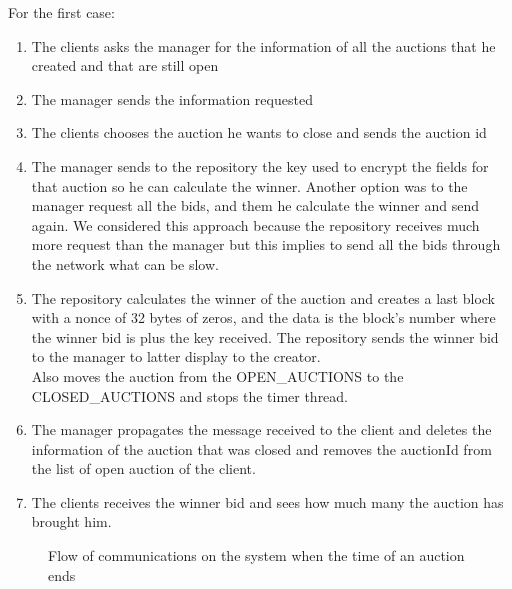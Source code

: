 \documentclass[12pt]{article}
\begin{document}
For the first case:

\begin{enumerate}
    \item The clients asks the manager for the information of all the auctions
      that he created and that are still open

    \item The manager sends the information requested

    \item The clients chooses the auction he wants to close and sends the auction id

    \item The manager sends to the repository the key used to encrypt the fields
      for that auction so he can calculate the winner. Another option was to the manager 
      request all the bids, and them he calculate the winner and send again. We considered
      this approach because the repository receives much more request than the manager but
      this implies to send all the bids through the network what can be slow.

    \item The repository calculates the winner of the auction and creates a last block with
      a nonce of 32 bytes of zeros, and the data is the block's number where the winner bid is plus the key received. 
      The repository sends the winner bid to the manager to latter display to 
      the creator. \\
      Also moves the auction from the OPEN\_AUCTIONS to the CLOSED\_AUCTIONS and stops the timer
        thread.

    \item The manager propagates the message received to the client and deletes the information
      of the auction that was closed and removes the auctionId from the list of open auction of the 
      client.

    \item The clients receives the winner bid and sees how much many the auction has brought him.

\end{enumerate}

\begin{figure}[h]
  \caption{Flow of communications on the system when the time of an auction ends}
  \label{fig:auctionTerminationTime}
\end{figure}
\end{document}

